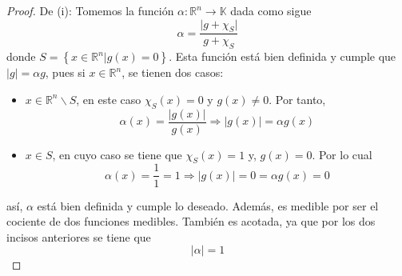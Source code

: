 \documentclass[12pt]{report}
\theoremstyle{largebreak}
\newcommand\abs[1]{\ensuremath{\big|#1\big|}}
\newcommand\cf[3]{\ensuremath{#1:#2\rightarrow#3}}
\begin{document}
    \begin{proof}
        De (i): Tomemos la función $\cf{\alpha}{\mathbb{R}^n}{\mathbb{K}}$ dada como sigue
        \begin{equation*}
            \alpha=\frac{\abs{g+\chi_S}}{g+\chi_S}
        \end{equation*}
        donde $S=\left\{x\in\mathbb{R}^n\Big|g(x)=0 \right\}$. Esta función está bien definida y cumple que $\abs{g}=\alpha g$, pues si $x\in\mathbb{R}^n$, se tienen dos casos:
        \begin{itemize}
            \item $x\in\mathbb{R}^n\backslash S$, en este caso $\chi_S(x)=0$ y $g(x)\neq0$. Por tanto,
            \begin{equation*}
                \alpha(x)=\frac{\abs{g(x)}}{g(x)}\Rightarrow \abs{g(x)}=\alpha g(x)
            \end{equation*}
            \item $x\in S$, en cuyo caso se tiene que $\chi_S(x)=1$ y, $g(x)=0$. Por lo cual
            \begin{equation*}
                \alpha(x)=\frac{1}{1}=1\Rightarrow\abs{g(x)}=0=\alpha g(x)=0
            \end{equation*}
        \end{itemize}
        así, $\alpha$ está bien definida y cumple lo deseado. Además, es medible por ser el cociente de dos funciones medibles. También es acotada, ya que por los dos incisos anteriores se tiene que
        \begin{equation*}
            \abs{\alpha}=1
        \end{equation*}


\end{proof}
\end{document}
